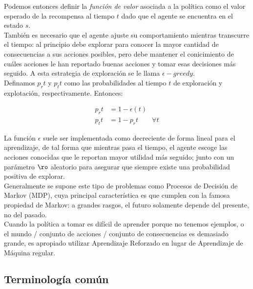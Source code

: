 Podemos entonces definir la \textit{funci\'on de valor} asociada a la pol\'itica como el valor esperado de la recompensa al tiempo $t$ dado que el agente se encuentra en el estado $s$.\\




Tambi\'en es necesario que el agente ajuste su comportamiento mientras transcurre el tiempo: al principio debe explorar para conocer la mayor cantidad de consecuencias a sus acciones posibles, pero debe mantener el conicimiento de cu\'ales acciones le han reportado buenas acciones y tomar esas decisiones m\'as seguido. A esta estrategia de exploraci\'on se le llama $\epsilon-greedy$.\\

Definamos $p_r{t}$ y $p_t{t}$ como las probabilidades al tiempo $t$ de exploraci\'on y explotaci\'on, respectivamente. Entonces:

\vspace{-30pt}
\begin{align*}
p_r{t} &= 1 - \epsilon(t) \\
p_t{t} &= 1 - p_r{t} \quad \quad \forall t
\end{align*}

La funci\'on $\epsilon$ suele ser implementada como decreciente de forma lineal para el aprendizaje,  de tal forma que mientras pasa el tiempo, el agente escoge las acciones conocidas que le reportan mayor utilidad m\'as seguido; junto con un par\'ametro $\ro$ aleatorio para asegurar que siempre existe una probabilidad positiva de explorar.\\

Generalmente se supone este tipo de problemas como Procesos de Decisi\'on de Markov (MDP), cuya principal caracter\'istica es que cumplen con la famosa propiedad de Markov: a grandes rasgos, el futuro solamente depende del presente, no del pasado.\\


Cuando la pol\'itica a tomar es dif\'icil de aprender porque no tenemos ejemplos, o el mundo / conjunto de acciones / conjunto de consecuencias es demasiado grande, es apropiado utilizar Aprendizaje Reforzado en lugar de Aprendizaje de M\'aquina regular.

\subsection{Terminolog\'ia com\'un}

